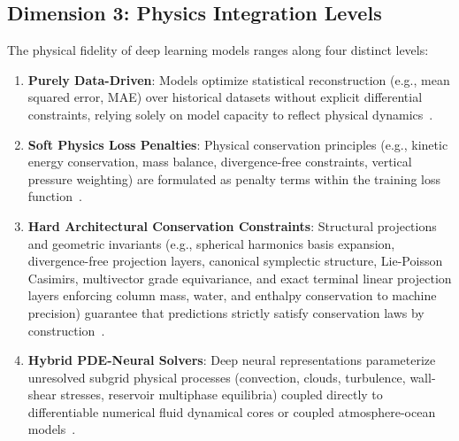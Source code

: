 \subsection{Dimension 3: Physics Integration Levels}
The physical fidelity of deep learning models ranges along four distinct levels:
\begin{enumerate}
    \item \textbf{Purely Data-Driven}: Models optimize statistical reconstruction (e.g., mean squared error, MAE) over historical datasets without explicit differential constraints, relying solely on model capacity to reflect physical dynamics~\cite{bi2023pangu,lam2023graphcast,smith2023earthpt,fuller2023croma,astruc2024anysat}.
    \item \textbf{Soft Physics Loss Penalties}: Physical conservation principles (e.g., kinetic energy conservation, mass balance, divergence-free constraints, vertical pressure weighting) are formulated as penalty terms within the training loss function~\cite{chen2023fengwu,pathak2022fourcastnet,nguyen2023stormer,li2024seeds,wen2022ufno,cresswellclay2024dlesym,cutolo2025swot}.
    \item \textbf{Hard Architectural Conservation Constraints}: Structural projections and geometric invariants (e.g., spherical harmonics basis expansion, divergence-free projection layers, canonical symplectic structure, Lie-Poisson Casimirs, multivector grade equivariance, and exact terminal linear projection layers enforcing column mass, water, and enthalpy conservation to machine precision) guarantee that predictions strictly satisfy conservation laws by construction~\cite{bonev2023sfno,makara2026symplectic,eldred2023lpnets,beucler2021enforcing,wattmeyer2024ace,brandstetter2023clifford,wan2024ste}.
    \item \textbf{Hybrid PDE-Neural Solvers}: Deep neural representations parameterize unresolved subgrid physical processes (convection, clouds, turbulence, wall-shear stresses, reservoir multiphase equilibria) coupled directly to differentiable numerical fluid dynamical cores or coupled atmosphere-ocean models~\cite{kochkov2024neuralgcm,yu2023climsim,nearing2024globalflood,wen2021ccsnet,duncan2025samudrace,lozano2023buildingblock}.
\end{enumerate}

